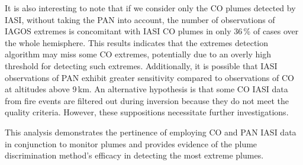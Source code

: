 \documentclass[acp, manuscript]{copernicus}
\begin{document}
It is also interesting to note that if we consider only the CO plumes detected by IASI, without taking the PAN into account, the number of observations of IAGOS extremes is concomitant with IASI CO plumes in only 36\,\% of cases over the whole hemisphere. This results indicates that the extremes detection algorithm may miss some CO extremes, potentially due to an overly high threshold for detecting such extremes. Additionally, it is possible that IASI observations of PAN exhibit greater sensitivity compared to observations of CO at altitudes above 9\,km. An alternative hypothesis is that some CO IASI data from fire events are filtered out during inversion because they do not meet the quality criteria. However, these suppositions necessitate further investigations.


This analysis demonstrates the pertinence of employing CO and PAN IASI data in conjunction to monitor plumes and provides evidence of the plume discrimination method's efficacy in detecting the most extreme plumes. %


\end{document}
